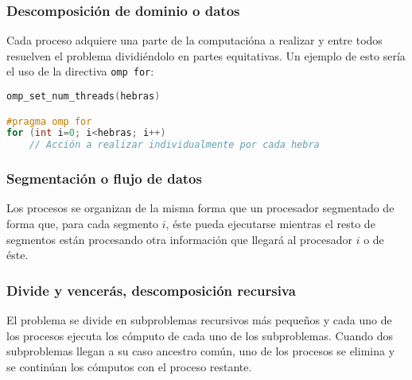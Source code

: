 \subsubsection{Descomposición de dominio o datos}

Cada proceso adquiere una parte de la computacióna a realizar y entre todos resuelven el problema dividiéndolo en partes equitativas.
Un ejemplo de esto sería el uso de la directiva \texttt{omp for}:

\begin{lstlisting}[language=C]
omp_set_num_threads(hebras)

#pragma omp for
for (int i=0; i<hebras; i++)
	// Acción a realizar individualmente por cada hebra
\end{lstlisting}

\subsubsection{Segmentación o flujo de datos}

Los procesos se organizan de la misma forma que un procesador segmentado de forma que, para cada segmento $i$, éste pueda ejecutarse mientras el resto de segmentos están procesando otra información que llegará al procesador $i$ o de éste.

\subsubsection{Divide y vencerás, descomposición recursiva}

El problema se divide en subproblemas recursivos más pequeños y cada uno de los procesos ejecuta los cómputo de cada uno de los subproblemas.
Cuando dos subproblemas llegan a su caso ancestro común, uno de los procesos se elimina y se continúan los cómputos con el proceso restante.
